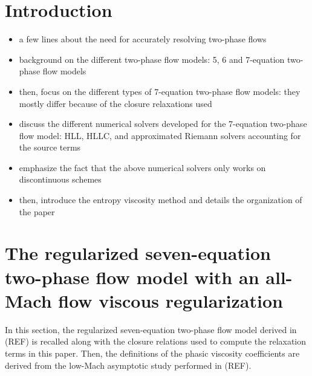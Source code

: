 \documentclass[preprint,10pt]{elsarticle}
\begin{document}
\section{Introduction}\label{sec:intro}
\begin{itemize}
\item a few lines about the need for accurately resolving two-phase flows
\item background on the different two-phase flow models: 5, 6 and 7-equation two-phase flow models
\item then, focus on the different types of 7-equation two-phase flow models: they mostly differ because of the closure relaxations used
\item discuss the different numerical solvers developed for the 7-equation two-phase flow model: HLL, HLLC, and approximated Riemann solvers accounting for the source terms
\item emphasize the fact that the above numerical solvers only works on discontinuous schemes
\item then, introduce the entropy viscosity method and details the organization of the paper 
\end{itemize}
\section{The regularized seven-equation two-phase flow model with an all-Mach flow viscous regularization}\label{sec:7-equ-model}
In this section, the regularized seven-equation two-phase flow model derived in (REF) is recalled along with the closure relations used to compute the relaxation terms in this paper. Then, the definitions of the phasic viscosity coefficients are derived from the low-Mach asymptotic study performed in (REF). 
%
\end{document}
